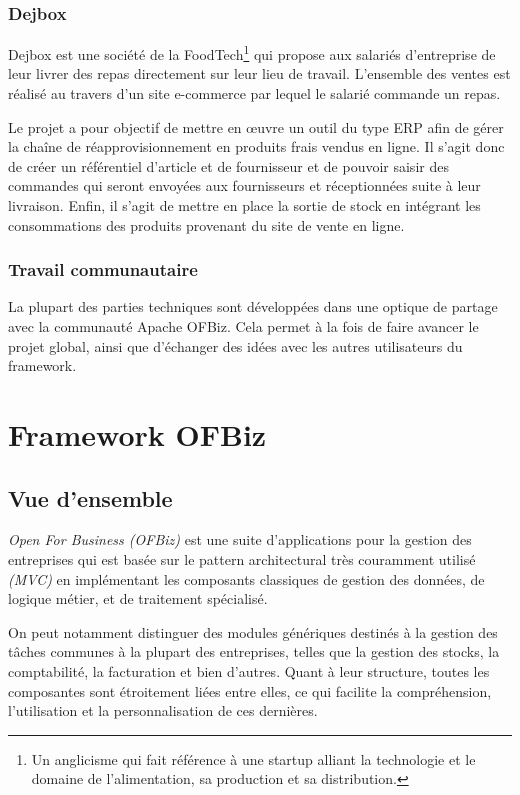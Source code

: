 \subsubsection{Dejbox}
\label{dejbox}
Dejbox est une société de la FoodTech\footnote{Un anglicisme qui fait référence à une startup alliant la technologie et le domaine de l’alimentation, sa production et sa distribution.} qui propose aux salariés d’entreprise de leur livrer des repas directement sur leur lieu de travail. L’ensemble des ventes est réalisé au travers d’un site e-commerce par lequel le salarié commande un repas.

Le projet a pour objectif de mettre en œuvre un outil du type ERP afin de gérer la chaîne de réapprovisionnement en produits frais vendus en ligne. Il s’agit donc de créer un référentiel d’article et de fournisseur et de pouvoir saisir des commandes qui seront envoyées aux fournisseurs et réceptionnées suite à leur livraison. Enfin, il s’agit de mettre en place la sortie de stock en intégrant les consommations des produits provenant du site de vente en ligne.

\subsubsection{Travail communautaire}
La plupart des parties techniques sont développées dans une optique de partage avec la communauté Apache OFBiz. Cela permet à la fois de faire avancer le projet global, ainsi que d'échanger des idées avec les autres utilisateurs du framework.  







\section{Framework OFBiz}
\subsection{Vue d'ensemble}
\emph{Open For Business (OFBiz)} est une suite d'applications pour la gestion des entreprises qui est basée sur le pattern architectural très couramment utilisé \emph{(MVC)} en implémentant les composants classiques de gestion des données, de logique métier, et de traitement spécialisé.

On peut notamment distinguer des modules génériques destinés à la gestion des tâches communes à la plupart des entreprises, telles que la gestion des stocks, la comptabilité, la facturation et bien d'autres. Quant à leur structure, toutes les composantes sont étroitement liées entre elles, ce qui facilite la compréhension, l'utilisation et la personnalisation de ces dernières. 


